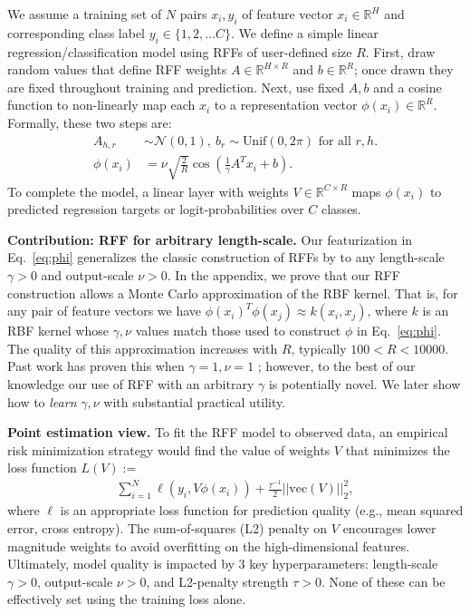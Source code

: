 We assume a training set of $N$ pairs $x_i, y_i$ of feature vector $x_i \in \mathbb{R}^H$ and corresponding class label $y_i \in \{1, 2, \ldots C\}$.
We define a simple linear regression/classification model using RFFs of user-defined size $R$.
First, draw random values that define RFF weights $A \in \mathbb{R}^{H \times R}$ and $b \in \mathbb{R}^R$; once drawn they are fixed throughout training and prediction.
Next, use fixed $A,b$ and a cosine function to non-linearly map each $x_i$ to a representation vector $\phi(x_i) \in \mathbb{R}^{R}$. Formally, these two steps are:
\begin{align}
    A_{h,r} &\sim \mathcal{N}(0, 1),
    ~b_{r} \sim \text{Unif}(0, 2\pi)
    \text{~for all~} r,h. \\
    \phi(x_i) &= \nu \sqrt{\frac{2}{R}} \cos\left(\frac{1}{\gamma} A^T x_i + b\right).
    \label{eq:phi}
\end{align}
To complete the model, a linear layer with weights $V \in \mathbb{R}^{C \times R}$ maps $\phi(x_i)$ to predicted regression targets or logit-probabilities over $C$ classes. 

\textbf{Contribution: RFF for arbitrary length-scale.} 
Our featurization in Eq.~\eqref{eq:phi} generalizes the classic construction of RFFs by \citet{rahimi2007random} to any length-scale $\gamma > 0$ and output-scale $\nu > 0$.
In the appendix, we prove that our RFF construction allows a Monte Carlo approximation of the RBF kernel. That is, for any pair of feature vectors we have $\phi(x_i)^T \phi(x_j) \approx k(x_i, x_j)$, where $k$ is an RBF kernel whose $\gamma,\nu$ values match those used to construct $\phi$ in Eq.~\eqref{eq:phi}. The quality of this approximation increases with $R$, typically $100 < R < 10000$. Past work has proven this when $\gamma{=}1,\nu{=}1$ \citep{rahimi2007random}; however, to the best of our knowledge our use of RFF with an arbitrary $\gamma$ is potentially novel.
We later show how to \emph{learn} $\gamma,\nu$ with substantial practical utility.

\textbf{Point estimation view.} To fit the RFF model to observed data, an  empirical risk minimization strategy would find the value of weights $V$ that minimizes the loss function $L(V) := $
\begin{align}
  \label{eq:rff_loss_with_l2_penalty}
  \sum_{i=1}^N \ell(y_i, V\phi(x_i) ) + \frac{\tau^{-1}}{2} || \text{vec}(V) ||_2 ^2,
\end{align}
where $\ell$ is an appropriate loss function for prediction quality (e.g., mean squared error, cross entropy). The sum-of-squares (L2) penalty on $V$ encourages lower magnitude weights to avoid overfitting on the high-dimensional features. Ultimately, model quality is impacted by 3 key hyperparameters: length-scale $\gamma > 0$, output-scale $\nu > 0$, and L2-penalty strength $\tau > 0$. None of these can be effectively set using the training loss alone.

